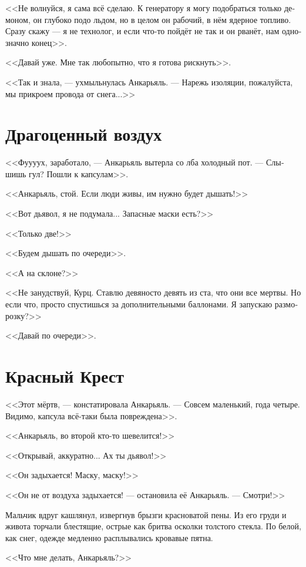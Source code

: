 \documentclass[a4paper,10pt,fleqn]{book}\usepackage{polyglossia}\setdefaultlanguage[babelshorthands=true]{russian}\setotherlanguage{english}\defaultfontfeatures{Ligatures=TeX,Mapping=tex-text}\usepackage{xcolor}\newcommand{\ml}[3]{#2}
\begin{document}
<<Не волнуйся, я сама всё сделаю.
К генератору я могу подобраться только демоном, он глубоко подо льдом, но в целом он рабочий, в нём ядерное топливо.
Сразу скажу --- я не технолог, и если что-то пойдёт не так и он рванёт, нам однозначно конец>>.

<<Давай уже.
Мне так любопытно, что я готова рискнуть>>.

<<Так и знала, --- ухмыльнулась Анкарьяль.
--- Нарежь изоляции, пожалуйста, мы прикроем провода от снега...>>

\section{Драгоценный воздух}

<<Фуууух, заработало, --- Анкарьяль вытерла со лба холодный пот.
--- Слышишь гул?
Пошли к капсулам>>.

<<Анкарьяль, стой.
Если люди живы, им нужно будет дышать!>>

<<Вот дьявол, я не подумала...
Запасные маски есть?>>

<<Только две!>>

<<Будем дышать по очереди>>.

<<А на склоне?>>

<<Не занудствуй, Курц.
Ставлю девяносто девять из ста, что они все мертвы.
Но если что, просто спустишься за дополнительными баллонами.
Я запускаю разморозку?>>

<<Давай по очереди>>.

\section{Красный Крест}

<<Этот мёртв, --- констатировала Анкарьяль.
--- Совсем маленький, года четыре.
Видимо, капсула всё-таки была повреждена>>.

<<Анкарьяль, во второй кто-то шевелится!>>

<<Открывай, аккуратно... Ах ты дьявол!>>

<<Он задыхается!
Маску, маску!>>

<<Он не от воздуха задыхается! --- остановила её Анкарьяль.
--- Смотри!>>

Мальчик вдруг кашлянул, извергнув брызги красноватой пены.
Из его груди и живота торчали блестящие, острые как бритва осколки толстого стекла.
По белой, как снег, одежде медленно расплывались кровавые пятна.

<<Что мне делать, Анкарьяль?>>
\end{document}
